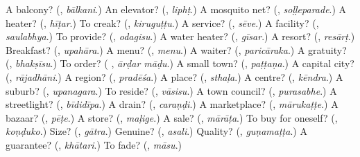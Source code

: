 \begin{tcolorbox}[breakable,colback=teal!4,colframe=teal!35!black,title={Before you move on}]
A balcony? (\textbf{}, \emph{bālkani}.) An elevator? (\textbf{}, \emph{liphṭ}.) A mosquito net? (\textbf{}, \emph{soḷḷeparade}.) A heater? (\textbf{}, \emph{hīṭar}.) To creak? (\textbf{}, \emph{kiruguṭṭu}.) A service? (\textbf{}, \emph{sēve}.) A facility? (\textbf{}, \emph{saulabhya}.) To provide? (\textbf{}, \emph{odagisu}.) A water heater? (\textbf{}, \emph{gīsar}.) A resort? (\textbf{}, \emph{resārṭ}.) Breakfast? (\textbf{}, \emph{upahāra}.) A menu? (\textbf{}, \emph{menu}.) A waiter? (\textbf{}, \emph{paricāraka}.) A gratuity? (\textbf{}, \emph{bhakṣīsu}.) To order? (\textbf{ }, \emph{ārḍar māḍu}.) A small town? (\textbf{}, \emph{paṭṭaṇa}.) A capital city? (\textbf{}, \emph{rājadhāni}.) A region? (\textbf{}, \emph{pradēśa}.) A place? (\textbf{}, \emph{sthaḷa}.) A centre? (\textbf{}, \emph{kēndra}.) A suburb? (\textbf{}, \emph{upanagara}.) To reside? (\textbf{}, \emph{vāsisu}.) A town council? (\textbf{}, \emph{purasabhe}.) A streetlight? (\textbf{}, \emph{bīdidīpa}.) A drain? (\textbf{}, \emph{caraṇḍi}.) A marketplace? (\textbf{}, \emph{mārukaṭṭe}.) A bazaar? (\textbf{}, \emph{pēṭe}.) A store? (\textbf{}, \emph{maḷige}.) A sale? (\textbf{}, \emph{mārāṭa}.) To buy for oneself? (\textbf{}, \emph{koṇḍuko}.) Size? (\textbf{}, \emph{gātra}.) Genuine? (\textbf{}, \emph{asali}.) Quality? (\textbf{}, \emph{guṇamaṭṭa}.) A guarantee? (\textbf{}, \emph{khātari}.) To fade? (\textbf{}, \emph{māsu}.)
\end{tcolorbox}
